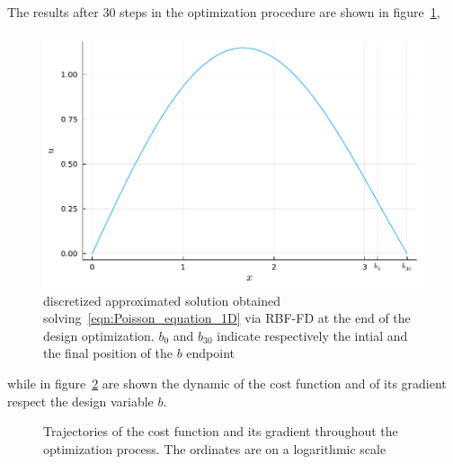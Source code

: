 \smallskip
The results after $30$ steps in the optimization procedure are shown in figure~\ref{fig:opt_results_1D},

\begin{figure}
	\centering
	\includegraphics[width=.75\textwidth]{img/uOpt_vs_x_1D.pdf}
	\caption{discretized approximated solution obtained solving~\eqref{eqn:Poisson_equation_1D} via RBF-FD at the end of the design optimization. $b_0$ and $b_{30}$ indicate respectively the intial and the final position of the $b$ endpoint}
	\label{fig:opt_results_1D}
\end{figure}

while in figure~\ref{fig:opt_history_1D} are shown the dynamic of the cost function and of its gradient respect the design variable $b$.

\begin{figure}
	\centering
	 \quad
	\caption{Trajectories of the cost function and its gradient throughout the optimization process. The ordinates are on a logarithmic scale}
	\label{fig:opt_history_1D}
\end{figure}



